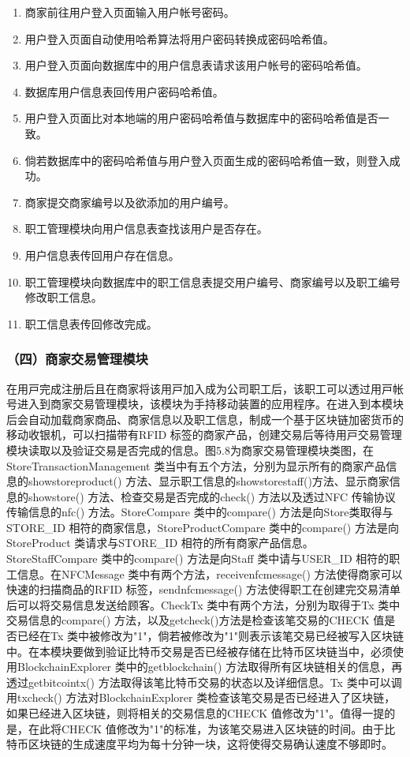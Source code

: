 	\begin{enumerate}
	\item 商家前往用户登入页面输入用户帐号密码。
	\item 用户登入页面自动使用哈希算法将用户密码转换成密码哈希值。
	\item 用户登入页面向数据库中的用户信息表请求该用户帐号的密码哈希值。
	\item 数据库用户信息表回传用户密码哈希值。
	\item 用户登入页面比对本地端的用户密码哈希值与数据库中的密码哈希值是否一致。
	\item 倘若数据库中的密码哈希值与用户登入页面生成的密码哈希值一致，则登入成功。
	\item 商家提交商家编号以及欲添加的用户编号。
	\item 职工管理模块向用户信息表查找该用户是否存在。
	\item 用户信息表传回用户存在信息。
	\item 职工管理模块向数据库中的职工信息表提交用户编号、商家编号以及职工编号修改职工信息。
	\item 职工信息表传回修改完成。
	\end{enumerate}

\subsubsection{（四）商家交易管理模块}
在⽤⼾完成注册后且在商家将该⽤⼾加⼊成为公司职⼯后，该职⼯可以透过⽤⼾帐号进⼊到商家交易管理模块，该模块为手持移动装置的应⽤程序。在进⼊到本模块后会⾃动加载商家商品、商家信息以及职⼯信息，制成⼀个基于区块链加密货币的移动收银机，可以扫描带有RFID 标签的商家产品，创建交易后等待⽤⼾交易管理模块读取以及验证交易是否完成的信息。图5.8为商家交易管理模块类图，在StoreTransactionManagement 类当中有五个⽅法，分别为显⽰所有的商家产品信息的showstoreproduct() ⽅法、显⽰职⼯信息的showstorestaff()⽅法、显⽰商家信息的showstore() ⽅法、检查交易是否完成的check() ⽅法以及透过NFC 传输协议传输信息的nfc() ⽅法。StoreCompare 类中的compare() ⽅法是向Store类取得与STORE\_ID 相符的商家信息，StoreProductCompare 类中的compare() ⽅法是向StoreProduct 类请求与STORE\_ID 相符的所有商家产品信息。StoreStaffCompare 类中的compare() ⽅法是向Staff 类中请与USER\_ID 相符的职⼯信息。在NFCMessage 类中有两个⽅法，receivenfcmessage() ⽅法使得商家可以快速的扫描商品的RFID 标签，sendnfcmessage() ⽅法使得职⼯在创建完交易清单后可以将交易信息发送给顾客。CheckTx 类中有两个⽅法，分别为取得于Tx 类中交易信息的compare() ⽅法，以及getcheck()⽅法是检查该笔交易的CHECK 值是否已经在Tx 类中被修改为"1"，倘若被修改为"1"则表示该笔交易已经被写⼊区块链中。在本模块要做到验证⽐特币交易是否已经被存储在⽐特币区块链当中，必须使⽤BlockchainExplorer 类中的getblockchain() ⽅法取得所有区块链相关的信息，再透过getbitcointx() ⽅法取得该笔⽐特币交易的状态以及详细信息。Tx 类中可以调⽤txcheck() ⽅法对BlockchainExplorer 类检查该笔交易是否已经进⼊了区块链，如果已经进⼊区块链，则将相关的交易信息的CHECK 值修改为"1"。值得⼀提的是，在此将CHECK 值修改为"1"的标准，为该笔交易进⼊区块链的时间。由于⽐特币区块链的⽣成速度平均为每⼗分钟⼀块，这将使得交易确认速度不够即时。


